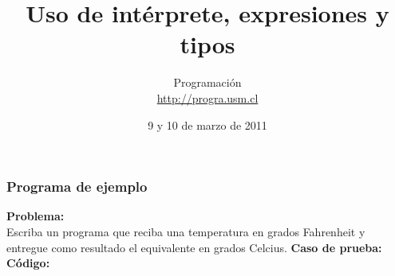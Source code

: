 \documentclass[12pt]{beamer}
\title{Uso de intérprete, expresiones y tipos}
\author{
  Programación \\ \url{http://progra.usm.cl}
}
\date{9 y 10 de marzo de 2011}
\begin{document}
  \begin{frame}
    \maketitle
  \end{frame}

  \begin{frame}
    \frametitle{Programa de ejemplo}\label{prog-ejemplo}
    \textbf{Problema:}\\
    Escriba un programa que reciba una temperatura en grados Fahrenheit
    y entregue como resultado el equivalente en grados Celcius.
    \vfill
    \textbf{Caso de prueba:}\\
    
    \vfill
    \textbf{Código:}\\
    
  \end{frame}
\end{document}
